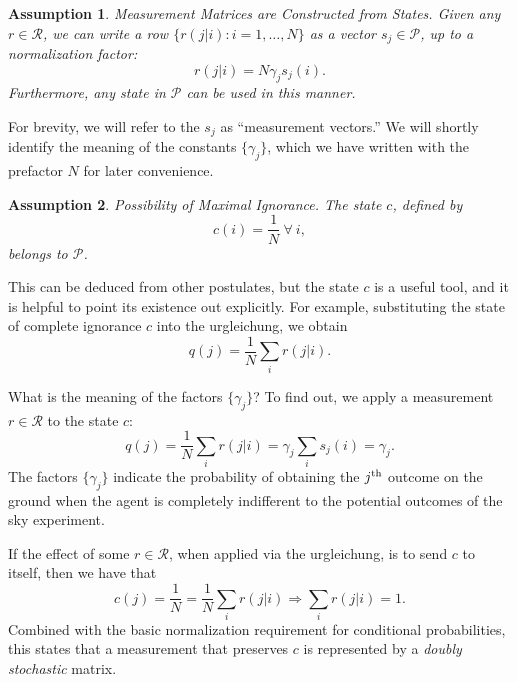 \documentclass[aps,pra,superscriptaddress,10pt,tightenlines,twocolumn,nofootinbib]{revtex4}
\newtheorem{assump}{Assumption}
\theoremstyle{remark}
\newcommand{\cP}{\mathcal{P}}
\newcommand{\cR}{\mathcal{R}}
\begin{document}
\begin{assump}
\label{assump:R-from-P}
Measurement Matrices are Constructed from States.  Given any $r \in \cR$, we
can write a row $\{r(j|i) : i = 1,\ldots,N\}$ as a vector
${s}_j \in \cP$, up to a normalization factor:
\begin{equation}
r(j|i) = N \gamma_j s_j(i).
\label{eq:R-from-P}
\end{equation}
Furthermore, any state in $\cP$ can be used in this manner.
\end{assump}
For brevity, we will refer to the $s_j$ as ``measurement vectors.''
We will shortly identify the meaning of the constants $\{\gamma_j\}$,
which we have written with the prefactor $N$ for later convenience.

\begin{assump}
\label{assump:ignorance}
Possibility of Maximal Ignorance. The state $c$, defined by
\begin{equation}
c(i) = \frac{1}{N}\ \forall\ i,
\end{equation}
belongs to $\cP$.
\end{assump}
This can be deduced from other postulates, but the state $c$ is a
useful tool, and it is helpful to point its existence out explicitly.
For example, substituting the state of complete ignorance ${c}$ into
the urgleichung, we obtain
\begin{equation}
q(j) = \frac{1}{N} \sum_i r(j|i).
\end{equation}

What is the meaning of the factors $\{\gamma_j\}$?  To find out, we apply
a measurement $r \in \cR$ to the state ${c}$:
\begin{equation}
q(j) = \frac{1}{N} \sum_i r(j|i)
 = \gamma_j \sum_i s_j(i)
 = \gamma_j.
\end{equation}
The factors $\{\gamma_j\}$ indicate the probability of obtaining the
$j^{\rm th}$ outcome on the ground when the agent is completely
indifferent to the potential outcomes of the sky experiment.

If the effect of some $r \in \cR$, when applied via the urgleichung,
is to send ${c}$ to itself, then we have that
\begin{equation}
c(j) = \frac{1}{N} = \frac{1}{N} \sum_i r(j|i)
\Rightarrow \sum_i r(j|i) = 1.
\end{equation}
Combined with the basic normalization requirement for conditional
probabilities, this states that a measurement that preserves
${c}$ is represented by a \emph{doubly stochastic} matrix.
\end{document}

